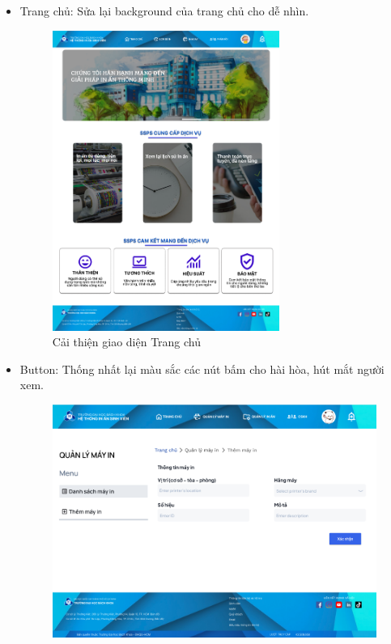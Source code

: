 \begin{itemize}
    \item Trang chủ: Sửa lại background của trang chủ cho dễ nhìn.
    \begin{figure}[H]
        \begin{center}
            \includegraphics[width=0.7\textwidth]{Images/Test/fix_homepage.png}
            \caption{Cải thiện giao diện Trang chủ}
        \end{center}
    \end{figure}
    \item Button: Thống nhất lại màu sắc các nút bấm cho hài hòa, hút mắt người xem.
    \begin{figure}[H]
        \begin{center}
            \includegraphics[width=1\textwidth]{Images/Test/fix_button.png}

\end{center}
\end{figure}
\end{itemize}
